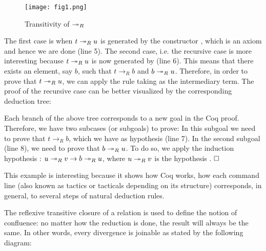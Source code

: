       \begin{figure}[h] \centering
        \texttt{[image: fig1.png]} \caption{Transitivity of
        $\tto_R$}\label{fig:trans} \end{figure}


    The first case is when $t \tto_R u$ is generated by the
    constructor , which is an axiom and hence we are done (line
    5).  The second case, i.e. the recursive case is more interesting
    because $t \tto_R u$ is now generated by  (line 6). This
    means that there exists an element, say $b$, such that $t \to_R b$
    and $b \tto_R u$. Therefore, in order to prove that $t \tto_R u$,
    we can apply the rule  taking  as the intermediary
    term. The proof of the recursive case can be better visualized by
    the corresponding deduction tree: {\scriptsize \begin{mathpar}
    \end{mathpar}}


    Each branch of the above tree corresponds to a new goal in the Coq
    proof. Therefore, we have two subcases (or subgoals) to prove: In
    this subgoal we need to prove that $t \to_R b$, which we have as
    hypothesis (line 7). In the second subgoal (line 8), we need to
    prove that $b \tto_R u$. To do so, we apply the induction
    hypothesis : $u \tto_R v \to b \tto_R u$, where
    $u\tto_R v$ is the hypothesis . $\hfill\Box$ 

 This example is interesting because it shows how Coq works, how
each command line (also known as tactics or tacticals depending on its
structure) corresponds, in general, to several steps of natural
deduction rules. \begin{coqdoccode}
\coqdocemptyline
\coqdocemptyline
\end{coqdoccode}
The reflexive transitive closure of a relation is used to define
    the notion of confluence: no matter how the reduction is done, the
    result will always be the same. In other words, every divergence
    is joinable as stated by the following diagram:


